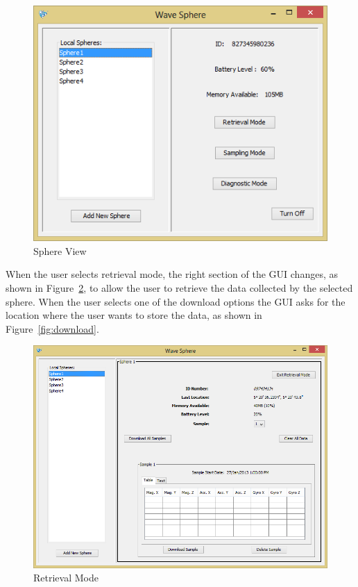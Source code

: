 \begin{figure}[H]
	\centering
	\includegraphics[scale=0.7]{img/viewSphere}
	\caption{Sphere View \label{fig:viewSphere}}
\end{figure}
When the user selects retrieval mode, the right section of the GUI changes, as shown in Figure~\ref{fig:retrievalMode}, to allow the user to retrieve the data collected by the selected sphere.  When the user selects one of the download options the GUI asks for the location where the user wants to store the data, as shown in Figure~\ref{fig:download}. 
\begin{figure}[H]
	\centering
	\includegraphics[scale=0.7]{img/retrievalMode}
	\caption{Retrieval Mode \label{fig:retrievalMode}}
\end{figure}

